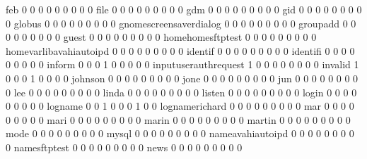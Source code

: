 \documentclass[compress,8pt]{beamer}
\begin{document}
\begin{frame}
\begin{Schunk}
  feb                                        0   0   0   0   0   0   0   0   0
  file                                       0   0   0   0   0   0   0   0   0
  gdm                                        0   0   0   0   0   0   0   0   0
  gid                                        0   0   0   0   0   0   0   0   0
  globus                                     0   0   0   0   0   0   0   0   0
  gnomescreensaverdialog                     0   0   0   0   0   0   0   0   0
  groupadd                                   0   0   0   0   0   0   0   0   0
  guest                                      0   0   0   0   0   0   0   0   0
  homehomesftptest                           0   0   0   0   0   0   0   0   0
  homevarlibavahiautoipd                     0   0   0   0   0   0   0   0   0
  identif                                    0   0   0   0   0   0   0   0   0
  identifi                                   0   0   0   0   0   0   0   0   0
  inform                                     0   0   0   1   0   0   0   0   0
  inputuserauthrequest                       1   0   0   0   0   0   0   0   0
  invalid                                    1   0   0   0   1   0   0   0   0
  johnson                                    0   0   0   0   0   0   0   0   0
  jone                                       0   0   0   0   0   0   0   0   0
  jun                                        0   0   0   0   0   0   0   0   0
  lee                                        0   0   0   0   0   0   0   0   0
  linda                                      0   0   0   0   0   0   0   0   0
  listen                                     0   0   0   0   0   0   0   0   0
  login                                      0   0   0   0   0   0   0   0   0
  logname                                    0   0   1   0   0   0   1   0   0
  lognamerichard                             0   0   0   0   0   0   0   0   0
  mar                                        0   0   0   0   0   0   0   0   0
  mari                                       0   0   0   0   0   0   0   0   0
  marin                                      0   0   0   0   0   0   0   0   0
  martin                                     0   0   0   0   0   0   0   0   0
  mode                                       0   0   0   0   0   0   0   0   0
  mysql                                      0   0   0   0   0   0   0   0   0
  nameavahiautoipd                           0   0   0   0   0   0   0   0   0
  namesftptest                               0   0   0   0   0   0   0   0   0
  news                                       0   0   0   0   0   0   0   0   0

\end{Schunk}
\end{frame}
\end{document}
